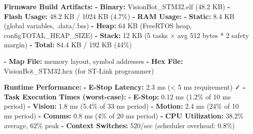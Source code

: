 \documentclass[
]{article}
\newenvironment{Shaded}{\begin{snugshade}}{\end{snugshade}}
\newcommand{\AttributeTok}[1]{\textcolor[rgb]{0.13,0.29,0.53}{#1}}
\newcommand{\FunctionTok}[1]{\textcolor[rgb]{0.13,0.29,0.53}{\textbf{#1}}}
\newcommand{\KeywordTok}[1]{\textcolor[rgb]{0.13,0.29,0.53}{\textbf{#1}}}
\begin{document}
\begin{Shaded}
\begin{Highlighting}[]
\FunctionTok{Firmware Build Artifacts}\KeywordTok{:}
\AttributeTok{  }\KeywordTok{{-}}\AttributeTok{ }\FunctionTok{Binary}\KeywordTok{:}\AttributeTok{ VisionBot\_STM32.elf (48.2 KB)}
\AttributeTok{  }\KeywordTok{{-}}\AttributeTok{ }\FunctionTok{Flash Usage}\KeywordTok{:}\AttributeTok{ 48.2 KB / 1024 KB (4.7\%)}
\AttributeTok{  }\KeywordTok{{-}}\AttributeTok{ }\FunctionTok{RAM Usage}\KeywordTok{:}
\AttributeTok{      }\KeywordTok{{-}}\AttributeTok{ }\FunctionTok{Static}\KeywordTok{:}\AttributeTok{ 8.4 KB (global variables, .data/.bss)}
\AttributeTok{      }\KeywordTok{{-}}\AttributeTok{ }\FunctionTok{Heap}\KeywordTok{:}\AttributeTok{ 64 KB (FreeRTOS heap, configTOTAL\_HEAP\_SIZE)}
\AttributeTok{      }\KeywordTok{{-}}\AttributeTok{ }\FunctionTok{Stack}\KeywordTok{:}\AttributeTok{ 12 KB (5 tasks × avg 512 bytes * 2 safety margin)}
\AttributeTok{      }\KeywordTok{{-}}\AttributeTok{ }\FunctionTok{Total}\KeywordTok{:}\AttributeTok{ 84.4 KB / 192 KB (44\%)}

\AttributeTok{  }\KeywordTok{{-}}\AttributeTok{ }\FunctionTok{Map File}\KeywordTok{:}\AttributeTok{ memory layout, symbol addresses}
\AttributeTok{  }\KeywordTok{{-}}\AttributeTok{ }\FunctionTok{Hex File}\KeywordTok{:}\AttributeTok{ VisionBot\_STM32.hex (for ST{-}Link programmer)}

\FunctionTok{Runtime Performance}\KeywordTok{:}
\AttributeTok{  }\KeywordTok{{-}}\AttributeTok{ }\FunctionTok{E{-}Stop Latency}\KeywordTok{:}\AttributeTok{ 2.3 ms (\textless{} 5 ms requirement) ✓}
\AttributeTok{  }\KeywordTok{{-}}\AttributeTok{ }\FunctionTok{Task Execution Times (worst{-}case)}\KeywordTok{:}
\AttributeTok{      }\KeywordTok{{-}}\AttributeTok{ }\FunctionTok{E{-}Stop}\KeywordTok{:}\AttributeTok{ 0.12 ms (1.2\% of 10 ms period)}
\AttributeTok{      }\KeywordTok{{-}}\AttributeTok{ }\FunctionTok{Vision}\KeywordTok{:}\AttributeTok{ 1.8 ms (5.4\% of 33 ms period)}
\AttributeTok{      }\KeywordTok{{-}}\AttributeTok{ }\FunctionTok{Motion}\KeywordTok{:}\AttributeTok{ 2.4 ms (24\% of 10 ms period)}
\AttributeTok{      }\KeywordTok{{-}}\AttributeTok{ }\FunctionTok{Comms}\KeywordTok{:}\AttributeTok{ 0.8 ms (4\% of 20 ms period)}
\AttributeTok{  }\KeywordTok{{-}}\AttributeTok{ }\FunctionTok{CPU Utilization}\KeywordTok{:}\AttributeTok{ 38.2\% average, 62\% peak}
\AttributeTok{  }\KeywordTok{{-}}\AttributeTok{ }\FunctionTok{Context Switches}\KeywordTok{:}\AttributeTok{ 520/sec (scheduler overhead: 0.8\%)}


\end{Highlighting}
\end{Shaded}
\end{document}
